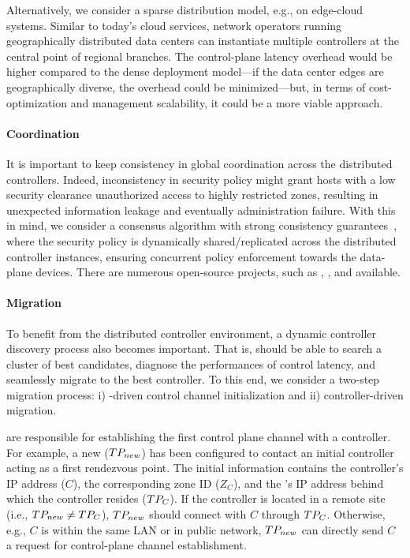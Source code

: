 Alternatively, we consider a sparse distribution model, e.g., on edge-cloud
systems. Similar to today's cloud services, network operators running
geographically distributed data centers can instantiate multiple controllers at
the central point of regional branches. The control-plane latency overhead would
be higher compared to the dense deployment model---if the data center edges are
geographically diverse, the overhead could be minimized---but, in terms of
cost-optimization and management scalability, it could be a more viable
approach.

\paragraph{Coordination}
It is important to keep consistency in global coordination across the
distributed controllers. Indeed, inconsistency in security policy might grant
hosts with a low security clearance unauthorized access to highly restricted
zones, resulting in unexpected information leakage and eventually administration
failure. With this in mind, we consider a consensus algorithm with strong
consistency guarantees~\cite{panda2013cap,phemius2014disco,shi2014giraffe},
where the security policy is dynamically shared/replicated across the
distributed controller instances, ensuring concurrent policy enforcement towards
the data-plane devices. There are numerous open-source projects, such as
, , and
 available.

\paragraph{\tp Migration}
To benefit from the distributed controller environment, a dynamic controller discovery
process also becomes important. That is, \tps should be able to search a cluster of best
candidates, diagnose the performances of control latency, and seamlessly migrate to the
best controller. To this end, we consider a two-step migration process: i) \tp-driven
control channel initialization and ii) controller-driven \tp migration.

\tps are responsible for establishing the first control plane channel with a controller.
For example, a new \tp ($TP_{new}$) has been configured to contact an initial controller
acting as a first rendezvous point.
The initial information contains the controller's IP address
($C$), the corresponding zone ID ($Z_{C}$), and the \tp's IP address behind which the controller
resides ($TP_{C}$). If the controller is located in a remote site (i.e., $TP_{new}
	\neq TP_{C}$), $TP_{new}$ should connect with $C$ through $TP_{C}$. Otherwise, e.g.,
$C$ is within the same LAN or in public network, $TP_{new}$ can directly send $C$ a request
for control-plane channel establishment.

